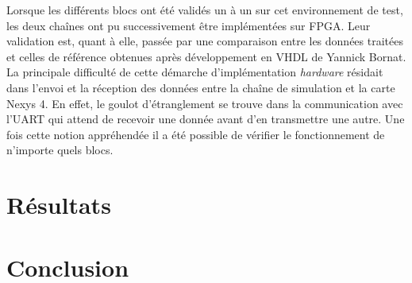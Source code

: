 \documentclass[a4paper,12pt]{article}
\begin{document}
	Lorsque les différents blocs ont été validés un à un sur cet environnement de test, les deux chaînes ont pu successivement être implémentées sur FPGA. Leur validation est, quant à elle, passée par une comparaison entre les données traitées et celles de référence obtenues après développement en VHDL de Yannick Bornat. La principale difficulté de cette démarche d'implémentation \textit{hardware} résidait dans l'envoi et la réception des données entre la chaîne de simulation et la carte Nexys 4. En effet, le goulot d'étranglement se trouve dans la communication avec l'UART qui attend de recevoir une donnée avant d'en transmettre une autre. Une fois cette notion appréhendée il a été possible de vérifier le fonctionnement de n'importe quels blocs.
\newpage
\section{Résultats}
\newpage
\section{Conclusion}
\end{document}
